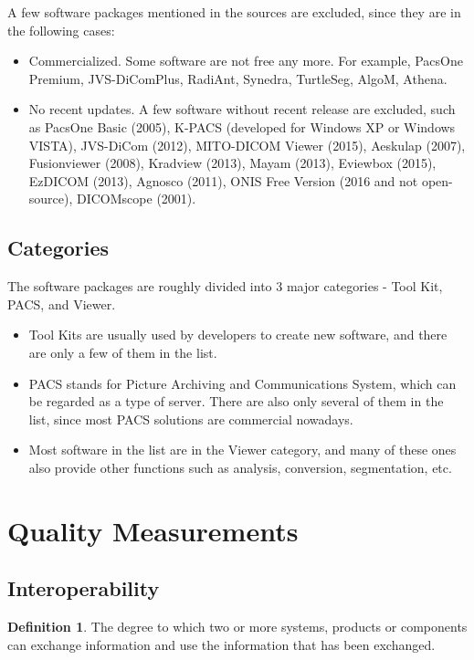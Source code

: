 \documentclass{article}
\theoremstyle{definition}
\newtheorem{defn}{Definition}
\begin{document}
A few software packages mentioned in the sources are excluded, since they are in
the following cases:
\begin{itemize}
\item Commercialized. Some software are not free any more. For example, PacsOne
Premium, JVS-DiComPlus, RadiAnt, Synedra, TurtleSeg, AlgoM, Athena.
\item No recent updates. A few software without recent release are excluded,
such as PacsOne Basic (2005), K-PACS (developed for Windows XP or Windows
VISTA), JVS-DiCom (2012), MITO-DICOM Viewer (2015), Aeskulap (2007),
Fusionviewer (2008), Kradview (2013), Mayam (2013), Eviewbox (2015), EzDICOM
(2013), Agnosco (2011), ONIS Free Version (2016 and not open-source), DICOMscope
(2001).
\end{itemize}

\subsection{Categories}

The software packages are roughly divided into 3 major categories - Tool Kit,
PACS, and Viewer.
\begin{itemize}
\item Tool Kits are usually used by developers to create new software, and there
are only a few of them in the list.
\item PACS stands for Picture Archiving and Communications System, which can be
regarded as a type of server. There are also only several of them in the list,
since most PACS solutions are commercial nowadays.
\item Most software in the list are in the Viewer category, and many of these
ones also provide other functions such as analysis, conversion, segmentation,
etc.
\end{itemize}

\section{Quality Measurements}

\subsection{Interoperability}
\begin{defn}
The degree to which two or more systems, products or components can exchange
information and use the information that has been exchanged.
\end{defn}
  
\end{document}
